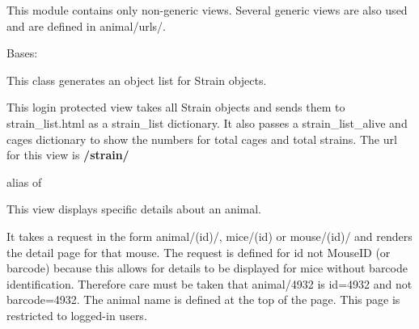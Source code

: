 \documentclass[letterpaper,10pt,english]{sphinxmanual}
\begin{document}
This module contains only non-generic views.  Several generic views are also used and are defined in animal/urls/.


\begin{fulllineitems}
\label{api:mousedb.animal.views.StrainList}
Bases: {\hyperref[api:mousedb.views.ProtectedListView]{}}

This class generates an object list for Strain objects.

This login protected view takes all Strain objects and sends them to strain\_list.html as a strain\_list dictionary.  It also passes a strain\_list\_alive and cages dictionary to show the numbers for total cages and total strains.
The url for this view is \textbf{/strain/}


\begin{fulllineitems}
\label{api:mousedb.animal.views.StrainList.get_context_data}
\end{fulllineitems}



\begin{fulllineitems}
\label{api:mousedb.animal.views.StrainList.model}
alias of 

\end{fulllineitems}


\end{fulllineitems}



\begin{fulllineitems}
\label{api:mousedb.animal.views.animal_detail}
This view displays specific details about an animal.

It takes a request in the form animal/(id)/, mice/(id) or mouse/(id)/ and renders the detail page for that mouse.  The request is defined for id not MouseID (or barcode) because this allows for details to be displayed for mice without barcode identification.
Therefore care must be taken that animal/4932 is id=4932 and not barcode=4932.  The animal name is defined at the top of the page.
This page is restricted to logged-in users.

\end{fulllineitems}
\end{document}
